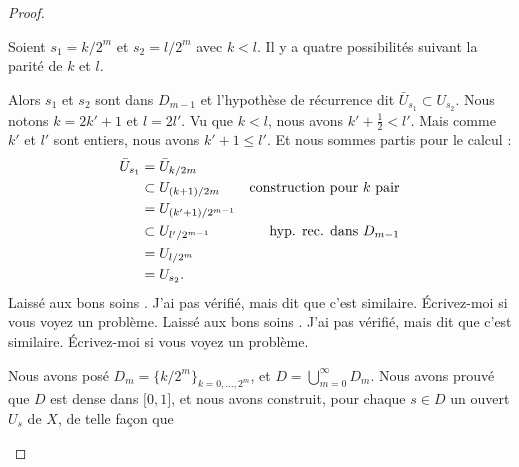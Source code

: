 \begin{proof}
\begin{subproof}
		Soient \( s_1=k/2^m\) et \( s_2=l/2^m\) avec \( k<l\). Il y a quatre possibilités suivant la parité de \( k\) et \( l\).
		\begin{subproof}
			Alors \( s_1\) et \( s_2\) sont dans \( D_{m-1}\) et l'hypothèse de récurrence dit \( \bar U_{s_1}\subset U_{s_2}\).
			Nous notons \( k=2k'+1\) et \( l=2l'\). Vu que \( k<l\), nous avons $k'+\frac{ 1 }{2}<l'$. Mais comme \( k'\) et \( l'\) sont entiers, nous avons \( k'+1\leq l'\). Et nous sommes partis pour le calcul :
			\begin{subequations}
				\begin{align}
					\bar U_{s_1} & =\bar U_{k/2m}                                                 \\
					             & \subset U_{(k+1)/2m}   & \text{construction pour \( k \) pair} \\
					             & =U_{(k'+1)/2^{m-1}}                                            \\
					             & \subset U_{l'/2^{m-1}} & \text{hyp. rec. dans \( D_{m-1}\)}    \\
					             & =U_{l/2^m}                                                     \\
					             & =U_{s_2}.
				\end{align}
			\end{subequations}
			Laissé aux bons soins . J'ai pas vérifié, mais \cite{BIBooQKARooMHqitK} dit que c'est similaire. Écrivez-moi si vous voyez un problème.
			Laissé aux bons soins . J'ai pas vérifié, mais \cite{BIBooQKARooMHqitK} dit que c'est similaire. Écrivez-moi si vous voyez un problème.
		\end{subproof}
		\spitem[Résumé]
		Nous avons posé \( D_m=\{ k/2^m \}_{k=0,\ldots, 2^m}\), et \( D=\bigcup_{m=0}^{\infty}D_m\). Nous avons prouvé que \( D\) est dense dans \( \mathopen[ 0 , 1 \mathclose]\), et nous avons construit, pour chaque \( s\in D\) un ouvert \( U_s\) de \( X\), de telle façon que

\end{subproof}
\end{proof}
